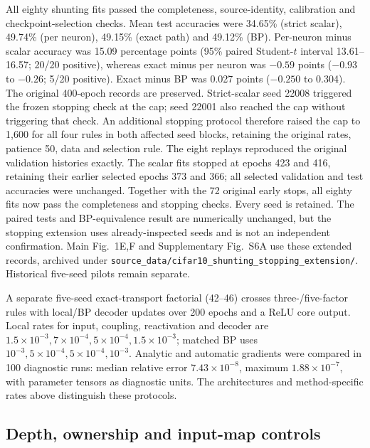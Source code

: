 All eighty shunting fits passed the completeness, source-identity, calibration and checkpoint-selection checks. Mean test accuracies were 34.65\% (strict scalar), 49.74\% (per neuron), 49.15\% (exact path) and 49.12\% (BP). Per-neuron minus scalar accuracy was 15.09 percentage points (95\% paired Student-$t$ interval 13.61--16.57; 20/20 positive), whereas exact minus per neuron was $-0.59$ points ($-0.93$ to $-0.26$; 5/20 positive). Exact minus BP was 0.027 points ($-0.250$ to 0.304). The original 400-epoch records are preserved. Strict-scalar seed 22008 triggered the frozen stopping check at the cap; seed 22001 also reached the cap without triggering that check. An additional stopping protocol therefore raised the cap to 1,600 for all four rules in both affected seed blocks, retaining the original rates, patience 50, data and selection rule. The eight replays reproduced the original validation histories exactly. The scalar fits stopped at epochs 423 and 416, retaining their earlier selected epochs 373 and 366; all selected validation and test accuracies were unchanged. Together with the 72 original early stops, all eighty fits now pass the completeness and stopping checks. Every seed is retained. The paired tests and BP-equivalence result are numerically unchanged, but the stopping extension uses already-inspected seeds and is not an independent confirmation. Main Fig.~1E,F and Supplementary Fig.~S6A use these extended records, archived under \texttt{source\_data/cifar10\_shunting\_stopping\_extension/}. Historical five-seed pilots remain separate.

A separate five-seed exact-transport factorial (42--46) crosses three-/five-factor rules with local/BP decoder updates over 200 epochs and a ReLU core output. Local rates for input, coupling, reactivation and decoder are $1.5\times10^{-3},7\times10^{-4},5\times10^{-4},1.5\times10^{-3}$; matched BP uses $10^{-3},5\times10^{-4},5\times10^{-4},10^{-3}$. Analytic and automatic gradients were compared in 100 diagnostic runs: median relative error $7.43\times10^{-8}$, maximum $1.88\times10^{-7}$, with parameter tensors as diagnostic units. The architectures and method-specific rates above distinguish these protocols.

\subsection{Depth, ownership and input-map controls}


